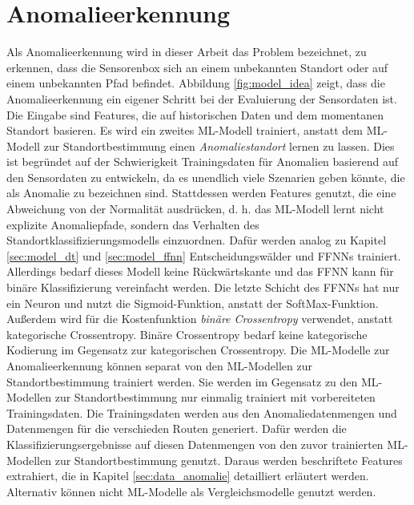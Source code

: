 \section{Anomalieerkennung}
Als Anomalieerkennung wird in dieser Arbeit das Problem bezeichnet, zu erkennen, dass die Sensorenbox sich an einem
unbekannten Standort oder auf einem unbekannten Pfad befindet.
Abbildung \ref{fig:model_idea} zeigt, dass die Anomalieerkennung ein eigener Schritt bei der Evaluierung der Sensordaten ist.
Die Eingabe sind Features, die auf historischen Daten und dem momentanen Standort basieren.
\newline
\newline
Es wird ein zweites ML-Modell trainiert, anstatt dem ML-Modell zur Standortbestimmung einen \textit{Anomaliestandort} lernen zu lassen.
Dies ist begründet auf der Schwierigkeit Trainingsdaten für Anomalien basierend auf den Sensordaten zu entwickeln,
da es unendlich viele Szenarien geben könnte, die als Anomalie zu bezeichnen sind.
Stattdessen werden Features genutzt, die eine Abweichung von der Normalität ausdrücken,
d. h. das ML-Modell lernt nicht explizite Anomaliepfade, sondern das Verhalten des Standortklassifizierungsmodells einzuordnen.
\newpage
Dafür werden analog zu Kapitel \ref{sec:model_dt} und \ref{sec:model_ffnn} Entscheidungswälder und FFNNs trainiert.
Allerdings bedarf dieses Modell keine Rückwärtskante und das FFNN kann für binäre Klassifizierung vereinfacht werden.
Die letzte Schicht des FFNNs hat nur ein Neuron und nutzt die Sigmoid-Funktion, anstatt der SoftMax-Funktion.
Außerdem wird für die Kostenfunktion \textit{binäre Crossentropy} verwendet, anstatt kategorische Crossentropy.
Binäre Crossentropy bedarf keine kategorische Kodierung im Gegensatz zur kategorischen Crossentropy.
\newline
\newline
Die ML-Modelle zur Anomalieerkennung können separat von den ML-Modellen zur Standortbestimmung trainiert werden.
Sie werden im Gegensatz zu den ML-Modellen zur Standortbestimmung nur einmalig trainiert mit vorbereiteten Trainingsdaten.
Die Trainingsdaten werden aus den Anomaliedatenmengen und Datenmengen für die verschieden Routen generiert.
Dafür werden die Klassifizierungsergebnisse auf diesen Datenmengen von den zuvor trainierten ML-Modellen zur Standortbestimmung genutzt.
Daraus werden beschriftete Features extrahiert, die in Kapitel \ref{sec:data_anomalie} detailliert erläutert werden.
\newline
\newline
Alternativ können nicht ML-Modelle als Vergleichsmodelle genutzt werden.
